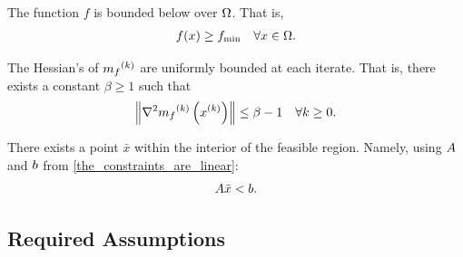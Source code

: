 \begin{assumption}
\label{lower_bound}
The function $f$ is bounded below over $\Omega$.
That is,
\begin{align}
f(x) \ge f_{\text{min}} \quad \forall x \in \Omega.
\end{align}
\end{assumption}


\begin{assumption}
\label{uniformly_bounded_hessians_of_mf}
The Hessian's of ${{m}_f}^{(k)}$ are uniformly bounded at each iterate. That is, there exists a constant $\beta \ge 1$ such that 
\begin{align}
\left\|\nabla^2 {{m}_f}^{(k)}\left(x^{(k)}\right)\right\| \le \beta - 1\quad \forall k \ge 0.
\end{align}
\end{assumption}


\begin{assumption}
\label{interior_point}
There exists a point $\bar x$ within the interior of the feasible region.
Namely, using ${A}$ and ${b}$ from \cref{the_constraints_are_linear}:
\begin{align}
{A} \bar x < {b}.
\end{align}
\end{assumption}

\label{linear_convergence_discussion}


\subsection{Required Assumptions}

